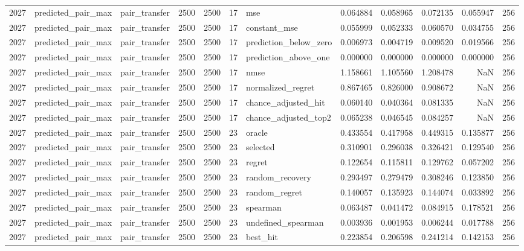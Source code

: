 \begin{tabular}{rllrrrlrrrrr}
2027 & predicted_pair_max & pair_transfer & 2500 & 2500 & 17 & mse & 0.064884 & 0.058965 & 0.072135 & 0.055947 & 256 \\
2027 & predicted_pair_max & pair_transfer & 2500 & 2500 & 17 & constant_mse & 0.055999 & 0.052333 & 0.060570 & 0.034755 & 256 \\
2027 & predicted_pair_max & pair_transfer & 2500 & 2500 & 17 & prediction_below_zero & 0.006973 & 0.004719 & 0.009520 & 0.019566 & 256 \\
2027 & predicted_pair_max & pair_transfer & 2500 & 2500 & 17 & prediction_above_one & 0.000000 & 0.000000 & 0.000000 & 0.000000 & 256 \\
2027 & predicted_pair_max & pair_transfer & 2500 & 2500 & 17 & nmse & 1.158661 & 1.105560 & 1.208478 & NaN & 256 \\
2027 & predicted_pair_max & pair_transfer & 2500 & 2500 & 17 & normalized_regret & 0.867465 & 0.826000 & 0.908672 & NaN & 256 \\
2027 & predicted_pair_max & pair_transfer & 2500 & 2500 & 17 & chance_adjusted_hit & 0.060140 & 0.040364 & 0.081335 & NaN & 256 \\
2027 & predicted_pair_max & pair_transfer & 2500 & 2500 & 17 & chance_adjusted_top2 & 0.065238 & 0.046545 & 0.084257 & NaN & 256 \\
2027 & predicted_pair_max & pair_transfer & 2500 & 2500 & 23 & oracle & 0.433554 & 0.417958 & 0.449315 & 0.135877 & 256 \\
2027 & predicted_pair_max & pair_transfer & 2500 & 2500 & 23 & selected & 0.310901 & 0.296038 & 0.326421 & 0.129540 & 256 \\
2027 & predicted_pair_max & pair_transfer & 2500 & 2500 & 23 & regret & 0.122654 & 0.115811 & 0.129762 & 0.057202 & 256 \\
2027 & predicted_pair_max & pair_transfer & 2500 & 2500 & 23 & random_recovery & 0.293497 & 0.279479 & 0.308246 & 0.123850 & 256 \\
2027 & predicted_pair_max & pair_transfer & 2500 & 2500 & 23 & random_regret & 0.140057 & 0.135923 & 0.144074 & 0.033892 & 256 \\
2027 & predicted_pair_max & pair_transfer & 2500 & 2500 & 23 & spearman & 0.063487 & 0.041472 & 0.084915 & 0.178521 & 256 \\
2027 & predicted_pair_max & pair_transfer & 2500 & 2500 & 23 & undefined_spearman & 0.003936 & 0.001953 & 0.006244 & 0.017788 & 256 \\
2027 & predicted_pair_max & pair_transfer & 2500 & 2500 & 23 & best_hit & 0.223854 & 0.206598 & 0.241214 & 0.142153 & 256 \\

\end{tabular}
